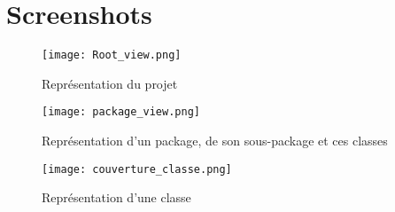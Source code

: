 \section{Screenshots}

\begin{figure}[h]
\texttt{[image: Root\_view.png]}
\caption{Représentation du projet}
\end{figure}

\begin{figure}[h]
\texttt{[image: package\_view.png]}
\caption{Représentation d'un package, de son sous-package et ces classes}
\end{figure}

\begin{figure}[h]
\texttt{[image: couverture\_classe.png]}
\caption{Représentation d'une classe}
\end{figure}
